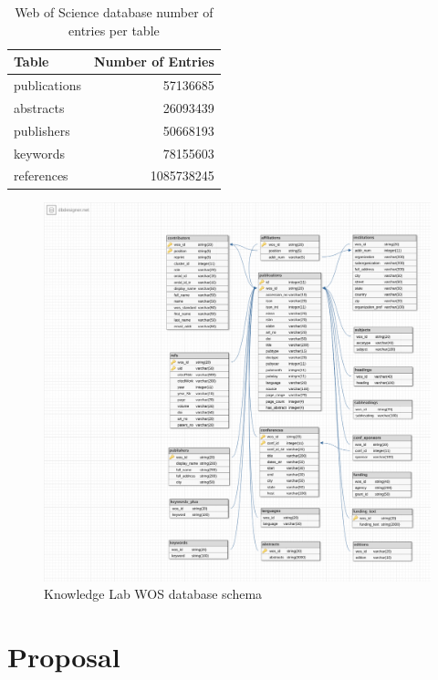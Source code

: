 \documentclass[12pt, a4paper]{article}
\begin{document}
\begin{table} [!ht]
	\centering
	\begin{tabular}{lr}
		\toprule
		Table & Number of Entries\\
		\midrule
		publications & 57136685\\
		abstracts &	26093439\\
		publishers & 50668193\\
		keywords &	78155603\\
		references &	1085738245\\
		\bottomrule
	\end{tabular}
	\caption{Web of Science database number of entries per table}\label{wos}
\end{table}

\begin{figure}[H]
	\centering
	\includegraphics[width=\textwidth]{wos2_schema}
	\caption{Knowledge Lab WOS database schema}\label{schema}
\end{figure}

\section{Proposal}
\end{document}
